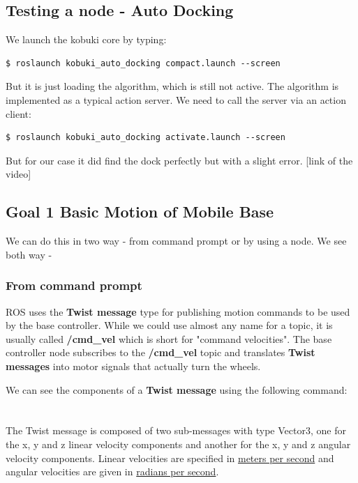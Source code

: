 \documentclass[10pt,a4paper]{article}
\begin{document}
\subsection{Testing a node - Auto Docking}
We launch the kobuki core by typing:

\begin{lstlisting}[frame=single] 
$ roslaunch kobuki_auto_docking compact.launch --screen
\end{lstlisting}
But it is just loading the algorithm, which is still not active. The algorithm is implemented as a typical action server. We need to call the server via an action client:

\begin{lstlisting}[frame=single] 
$ roslaunch kobuki_auto_docking activate.launch --screen
\end{lstlisting}

But for our case it did find the dock perfectly but with a slight error.
[link of the video]


\subsection{Goal 1 Basic Motion of Mobile Base}

We can do this in two way - from command prompt or by using a node. We see both way - 
\subsubsection{From command prompt}
ROS uses the \textbf{Twist message} type for publishing motion commands to be used by the base controller. While we could use almost any name for a topic, it is usually called \textbf{/cmd\_vel} which is short for "command velocities". The base controller node subscribes to the \textbf{/cmd\_vel} topic and translates \textbf{Twist messages} into motor signals that actually turn the wheels.

We can see the components of a \textbf{Twist message} using the following command:\\\\
\\

The Twist message is composed of two sub-messages with type Vector3, one for the x, y and z linear velocity components and another for the x, y and z angular velocity components. Linear velocities are specified in \underline{meters per second} and angular velocities are given in \underline{radians per second}.\\
\end{document}

